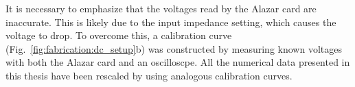 It is necessary to emphasize that the voltages read by the Alazar card are inaccurate. This is likely due to the input impedance setting, which causes the voltage to drop. To overcome this, a calibration curve (Fig.~\ref{fig:fabrication:dc_setup}b) was constructed by measuring known voltages with both the Alazar card and an oscilloscpe. All the numerical data presented in this thesis have been rescaled by using analogous calibration curves.







